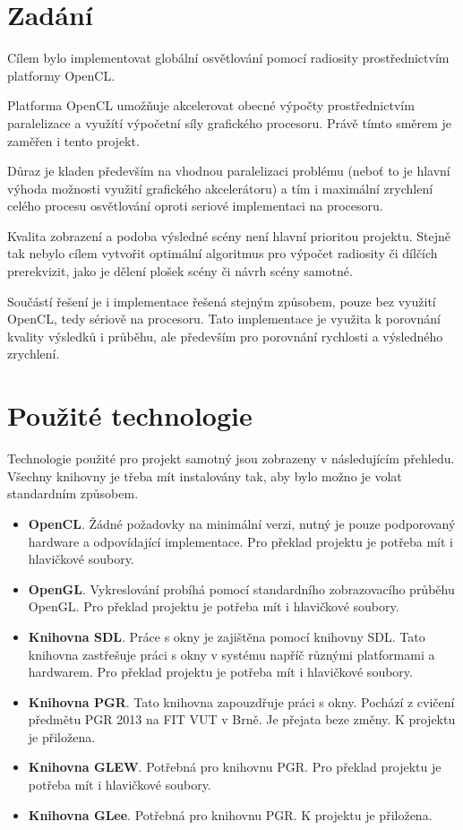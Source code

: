 \documentclass[11pt,a4paper]{article}
\begin{document}
\titlepageandcontents

\section{Zadání}
Cílem bylo implementovat globální osvětlování pomocí radiosity prostřednictvím platformy OpenCL.

Platforma OpenCL umožňuje akcelerovat obecné výpočty prostřednictvím paralelizace a využítí výpočetní síly grafického procesoru. Právě tímto směrem je zaměřen i tento projekt.

Důraz je kladen především na vhodnou paralelizaci problému (neboť to je hlavní výhoda možnosti využití grafického akcelerátoru) a tím i maximální zrychlení celého procesu osvětlování oproti seriové implementaci na procesoru.

Kvalita zobrazení a podoba výsledné scény není hlavní prioritou projektu. Stejně tak nebylo cílem vytvořit optimální algoritmus pro výpočet radiosity či dílčích prerekvizit, jako je dělení plošek scény či návrh scény samotné.

Součástí řešení je i implementace řešená stejným způsobem, pouze bez využití OpenCL, tedy sériově na procesoru. Tato implementace je využita k porovnání kvality výsledků i průběhu, ale především pro porovnání rychlosti a výsledného zrychlení.

\section{Použité technologie}
Technologie použité pro projekt samotný jsou zobrazeny v následujícím přehledu. Všechny knihovny je třeba mít instalovány tak, aby bylo možno je volat standardním způsobem.
\begin{itemize}
  \item \textbf{OpenCL}. Žádné požadovky na minimální verzi, nutný je pouze podporovaný hardware a  odpovídající implementace. Pro překlad projektu je potřeba mít i hlavičkové soubory.
  \item \textbf{OpenGL}. Vykreslování probíhá pomocí standardního zobrazovacího průběhu OpenGL. Pro překlad projektu je potřeba mít i hlavičkové soubory.
  \item \textbf{Knihovna SDL}. Práce s okny je zajištěna pomocí knihovny SDL. Tato knihovna zastřešuje práci s okny v systému napříč různými platformami a hardwarem. Pro překlad projektu je potřeba mít i hlavičkové soubory.
  \item \textbf{Knihovna PGR}. Tato knihovna zapouzdřuje práci s okny. Pochází z cvičení předmětu PGR 2013 na FIT VUT v Brně. Je přejata beze změny. K projektu je přiložena.
  \item \textbf{Knihovna GLEW}. Potřebná pro knihovnu PGR. Pro překlad projektu je potřeba mít i hlavičkové soubory.
  \item \textbf{Knihovna GLee}. Potřebná pro knihovnu PGR. K projektu je přiložena.
\end{itemize}
\end{document}

